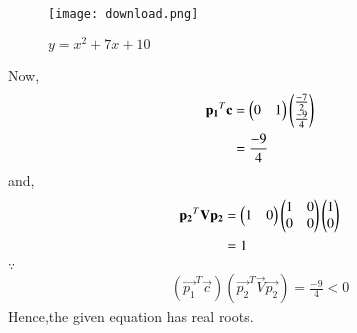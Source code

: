\documentclass[journal,12pt,twocolumn]{IEEEtran}
\begin{document}
\begin{figure}[!ht]
\centering
\texttt{[image: download.png]}
\caption{$y=x^2+7x+10$}
\label{ex3}	
\end{figure}
Now,
\begin{align}
\mathbf{p_1}^T\mathbf{c} &= \begin{pmatrix}0 & 1\end{pmatrix}\begin{pmatrix}\frac{-7}{2}\\\frac{-9}{4}\end{pmatrix}
\\
&= \frac{-9}{4}
\end{align}
and,
\begin{align}
\mathbf{p_2}^T\mathbf{V}\mathbf{p_2} &= \begin{pmatrix}1 & 0\end{pmatrix}\begin{pmatrix}1 & 0\\0& 0\end{pmatrix}\begin{pmatrix}1 \\ 0\end{pmatrix}
\\
&= 1
\end{align}
$\because$
\begin{align}
(\vec{p_1}^T\vec{c})(\vec{p_2}^T\vec{V}\vec{p_2}) = \frac{-9}{4}<0
\end{align}
Hence,the given equation has real roots.
\end{document}

